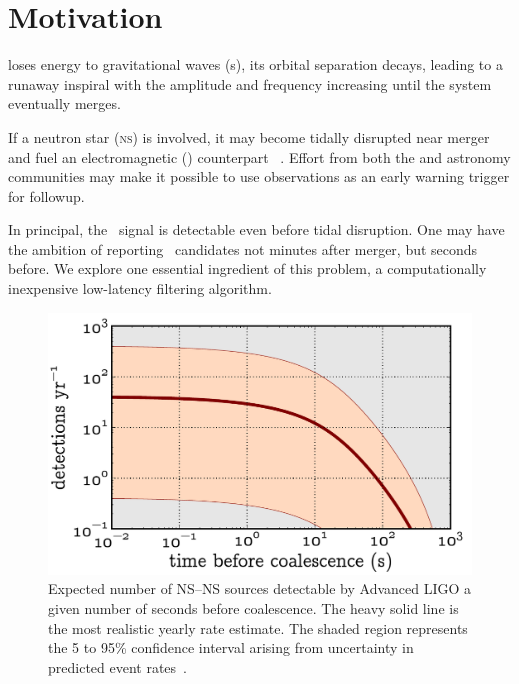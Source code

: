 \documentclass[portrait,plainboxedsections]{sciposter}
\begin{document}
\begin{minipage}[t]{0.25\textwidth}

\section*{Motivation}
 loses energy to gravitational waves (\GW{}s), its
orbital separation decays, leading to a runaway inspiral with the \GW{}
amplitude and frequency increasing until the system eventually merges.

{\setlength{\parindent}{1em}
If a neutron star (\textsc{ns}) is involved, it may become tidally disrupted near
merger and fuel an electromagnetic (\EM{}) counterpart~%
\citep{shibata:2007}.  Effort from both the \GW{} and astronomy communities may make it
possible to use \GW{} observations as an early warning trigger for \EM{}
followup.

In principal, the \GW\ signal is detectable even before tidal
disruption. One may have the ambition of reporting \GW\ candidates not minutes
after merger, but seconds before.  We explore one essential ingredient of this
problem, a computationally inexpensive low-latency filtering algorithm.

}%
\begin{figure}[h]
\includegraphics[width=1.05\textwidth]{figures/snr_in_time}
\caption{\label{fig:earlywarning}Expected number of {\small NS}--{\small NS}
sources detectable by Advanced {\small LIGO} a given number of seconds
before coalescence.  The heavy solid line is the most realistic yearly rate
estimate.  The shaded region represents the 5 to 95\% confidence interval
arising from uncertainty in predicted event rates~\citep{Abadie:2010p10836}.}
\end{figure}


\end{minipage}
\end{document}
